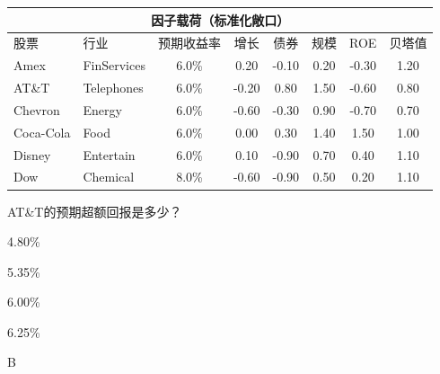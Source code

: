 \documentclass{article}
\newcounter{question} %
\begin{document}
\begin{question}
    \begin{center}
        \begin{tabular}{|l|l|c|c|c|c|c|c|}
            \hline
            \multicolumn{8}{|c|}{因子载荷（标准化敞口）} \\
            \hline
            股票 & 行业 & 预期收益率 & 增长 & 债券 & 规模 & ROE & 贝塔值 \\
            \hline
            Amex & FinServices & 6.0\% & 0.20 & -0.10 & 0.20 & -0.30 & 1.20 \\
            AT\&T & Telephones & 6.0\% & -0.20 & 0.80 & 1.50 & -0.60 & 0.80 \\
            Chevron & Energy & 6.0\% & -0.60 & -0.30 & 0.90 & -0.70 & 0.70 \\
            Coca-Cola & Food & 6.0\% & 0.00 & 0.30 & 1.40 & 1.50 & 1.00 \\
            Disney & Entertain & 6.0\% & 0.10 & -0.90 & 0.70 & 0.40 & 1.10 \\
            Dow & Chemical & 8.0\% & -0.60 & -0.90 & 0.50 & 0.20 & 1.10 \\
            \hline
        \end{tabular}
    \end{center}
    AT\&T的预期超额回报是多少？
\end{question}

\begin{choices}
    \item 4.80\%
    \item 5.35\%
    \item 6.00\%
    \item 6.25\%
\end{choices}

\begin{correctanswer}
    B
\end{correctanswer}
\end{document}
